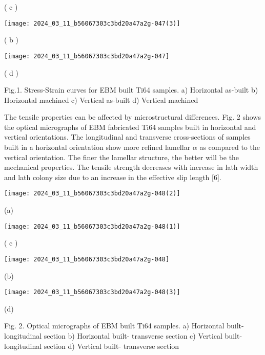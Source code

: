 \documentclass[10pt]{article}
\begin{document}
( c )

\begin{center}
\texttt{[image: 2024\_03\_11\_b56067303c3bd20a47a2g-047(3)]}
\end{center}

( b )

\begin{center}
\texttt{[image: 2024\_03\_11\_b56067303c3bd20a47a2g-047]}
\end{center}

( d )

Fig.1. Stress-Strain curves for EBM built Ti64 samples. a) Horizontal as-built b) Horizontal machined c) Vertical as-built d) Vertical machined

The tensile properties can be affected by microstructural differences. Fig. 2 shows the optical micrographs of EBM fabricated Ti64 samples built in horizontal and vertical orientations. The longitudinal and transverse cross-sections of samples built in a horizontal orientation show more refined lamellar $\alpha$ as compared to the vertical orientation. The finer the lamellar structure, the better will be the mechanical properties. The tensile strength decreases with increase in lath width and lath colony size due to an increase in the effective slip length [6].

\begin{center}
\texttt{[image: 2024\_03\_11\_b56067303c3bd20a47a2g-048(2)]}
\end{center}

(a)

\begin{center}
\texttt{[image: 2024\_03\_11\_b56067303c3bd20a47a2g-048(1)]}
\end{center}

( c )

\begin{center}
\texttt{[image: 2024\_03\_11\_b56067303c3bd20a47a2g-048]}
\end{center}

(b)

\begin{center}
\texttt{[image: 2024\_03\_11\_b56067303c3bd20a47a2g-048(3)]}
\end{center}

(d)

Fig. 2. Optical micrographs of EBM built Ti64 samples. a) Horizontal built- longitudinal section b) Horizontal built- transverse section c) Vertical built- longitudinal section d) Vertical built- transverse section
\end{document}
